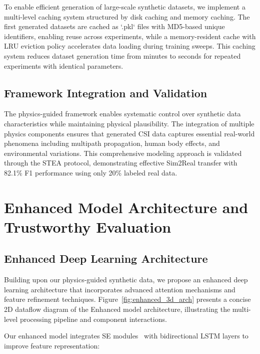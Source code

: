 \documentclass[journal]{IEEEtran}
\begin{document}
To enable efficient generation of large-scale synthetic datasets, we implement a multi-level caching system structured by disk caching and memory caching. The first generated datasets are cached as `.pkl` files with MD5-based unique identifiers, enabling reuse across experiments, while a memory-resident cache with LRU eviction policy accelerates data loading during training sweeps.
This caching system reduces dataset generation time from minutes to seconds for repeated experiments with identical parameters.



\subsection{Framework Integration and Validation}

The physics-guided framework enables systematic control over synthetic data characteristics while maintaining physical plausibility. The integration of multiple physics components ensures that generated CSI data captures essential real-world phenomena including multipath propagation, human body effects, and environmental variations. This comprehensive modeling approach is validated through the STEA protocol, demonstrating effective Sim2Real transfer with 82.1\% F1 performance using only 20\% labeled real data.

\section{Enhanced Model Architecture and Trustworthy Evaluation}

\subsection{Enhanced Deep Learning Architecture}

Building upon our physics-guided synthetic data, we propose an enhanced deep learning architecture that incorporates advanced attention mechanisms and feature refinement techniques. Figure~\ref{fig:enhanced_3d_arch} presents a concise 2D dataflow diagram of the Enhanced model architecture, illustrating the multi-level processing pipeline and component interactions.

Our enhanced model integrates SE modules~\cite{se_networks2018} with bidirectional LSTM layers to improve feature representation:
\end{document}

